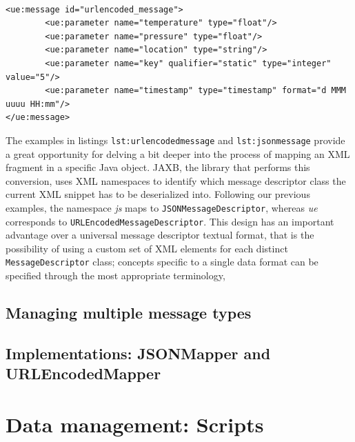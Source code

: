 \lstset{language=XML}
\begin{lstlisting}[float,floatplacement=!hbt,caption={An URLEncoded message
declaration. Thanks to the custom \texttt{URLEncodedMessageDescriptor}, trying
to create a non-primitive field results in an exception. Note the custom
\texttt{format} attribute on the timestamp field, which is employed to define
the encoding format for dates and times},label={lst:urlencodedmessage}]

<ue:message id="urlencoded_message">
        <ue:parameter name="temperature" type="float"/>
        <ue:parameter name="pressure" type="float"/>
        <ue:parameter name="location" type="string"/>
        <ue:parameter name="key" qualifier="static" type="integer" value="5"/>
        <ue:parameter name="timestamp" type="timestamp" format="d MMM uuuu HH:mm"/>
</ue:message>

\end{lstlisting}

The examples in listings \texttt{lst:urlencodedmessage} and
\texttt{lst:jsonmessage} provide a great opportunity for delving a bit deeper
into the process of mapping an XML fragment in a specific Java object. JAXB,
the library that performs this conversion, uses XML namespaces to identify
which message descriptor class the current XML snippet has to be deserialized
into. Following our previous examples, the namespace \textit{js} maps to
\texttt{JSONMessageDescriptor}, whereas \textit{ue} corresponds to
\texttt{URLEncodedMessageDescriptor}. This design has an important
advantage over a universal message descriptor textual format, that is the
possibility of using a custom set of XML elements for each distinct
\texttt{MessageDescriptor} class; concepts specific to a single data format can
be specified through the most appropriate terminology,  


\subsection{Managing multiple message types}

\subsection{Implementations: JSONMapper and URLEncodedMapper}


\section{Data management: Scripts}
\label{sec:components.script}

